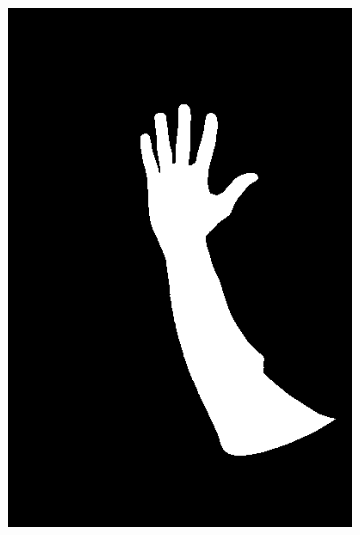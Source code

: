 \begin{figure}[h]
{\begin{subfigure}[b]{0.23\textwidth}
         \includegraphics[width=\textwidth]{images/results/cross/5_A_hgr2B_id10_1_ecu_hgr_y.png}
     \end{subfigure}
    \hfill
     \begin{subfigure}[b]{0.23\textwidth}
         \centering

\end{subfigure}}
\end{figure}
